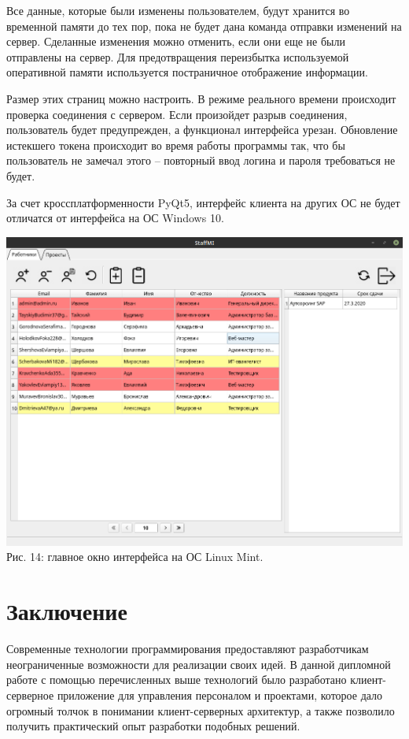\documentclass[14pt,a4paper,openbib]{extarticle}
\numberwithin{equation}{section}
\begin{document}
Все данные, которые были изменены пользователем, будут хранится во временной памяти до тех пор, пока не будет дана команда отправки изменений на сервер. Сделанные изменения можно отменить, если они еще не были отправлены на сервер. Для предотвращения переизбытка используемой оперативной памяти используется постраничное отображение информации.

Размер этих страниц можно настроить. В режиме реального времени происходит проверка соединения с сервером. Если произойдет разрыв соединения, пользователь будет предупрежден, а функционал интерфейса урезан. Обновление истекшего токена происходит во время работы программы так, что бы пользователь не замечал этого – повторный ввод логина и пароля требоваться не будет.

За счет кроссплатформенности PyQt5, интерфейс клиента на других ОС не будет отличатся от интерфейса на ОС Windows 10.
\begin{center}
\includegraphics[width=\textwidth]{img/main_window_linux.png}\\
Рис. 14: главное окно интерфейса на ОС Linux Mint.\\[\baselineskip]
\end{center}


\newpage
\section{Заключение}
Современные технологии программирования предоставляют разработчикам неограниченные возможности для реализации своих идей. В данной дипломной работе с помощью перечисленных выше технологий было разработано клиент-серверное приложение для управления персоналом и проектами, которое дало огромный толчок в понимании клиент-серверных архитектур, а также позволило получить практический опыт разработки подобных решений.
\end{document}
